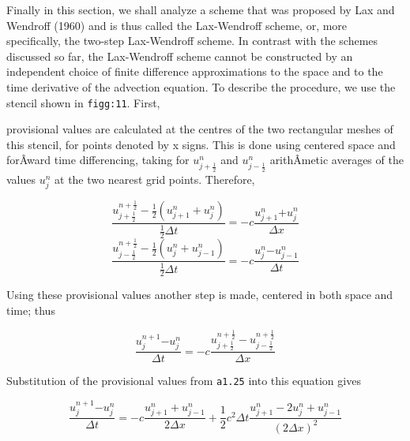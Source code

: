 Finally in this section, we shall analyze a scheme that was proposed by
Lax and Wendroff (1960) and is thus called the Lax-Wendroff scheme, or,
more specifically, the two-step Lax-Wendroff scheme. In contrast with
the schemes discussed so far, the Lax-Wendroff scheme cannot be
constructed by an independent choice of finite difference approximations
to the space and to the time derivative of the advection equation. To
describe the procedure, we use the stencil shown in \texttt{figg:11}.
First,

\begin{figure}
\centering
{}
\caption{}
\end{figure}

provisional values are calculated at the centres of the two rectangular
meshes of this stencil, for points denoted by x signs. This is done
using centered space and forÂ­ward time differencing, taking for
\(u_{j + \frac{1}{2}}^{n}\) and \(u_{j - \frac{1}{2}}^{n}\) arithÂ­metic
averages of the values \(u_{j}^{n}\) at the two nearest grid points.
Therefore,

{\[\frac{u_{j + \frac{1}{2}}^{n + \frac{1}{2}} - \frac{1}{2}\left( u_{j + 1}^{n} + u_{j}^{n} \right)}
{\frac{1}{2}\Delta t} = - c \frac{u_{j + 1}^{n}{+ u}_{j}^{n}}{\Delta x}\]\[\frac{u_{j - \frac{1}{2}}^{n + \frac{1}{2}} - \frac{1}{2}\left( u_{j}^{n} + u_{j - 1}^{n} \right)}{\frac{1}{2}\Delta t} = - c \frac{u_{j}^{n}{- u}_{j - 1}^{n}}{\Delta t}\]}

Using these provisional values another step is made, centered in both
space and time; thus

{\[\frac{u_{j}^{n + 1}{- u}_{j}^{n}}{\Delta t} =
 - c \frac{u_{j + \frac{1}{2}}^{n + \frac{1}{2}} - u_{j - \frac{1}{2}}^{n + \frac{1}{2}}}{\Delta x}\]}

Substitution of the provisional values from \texttt{a1.25} into this
equation gives

{\[\frac{u_{j}^{n + 1}{- u}_{j}^{n}}{\Delta t} =
 - c\frac{u_{j + 1}^{n} + u_{j - 1}^{n}}{2\Delta x} +
  \frac{1}{2}c^{2}\Delta t\frac{u_{j + 1}^{n} - 2u_{j}^{n} + u_{j - 1}^{n}}
  {\left( 2\Delta x \right)^{2}}\]}


